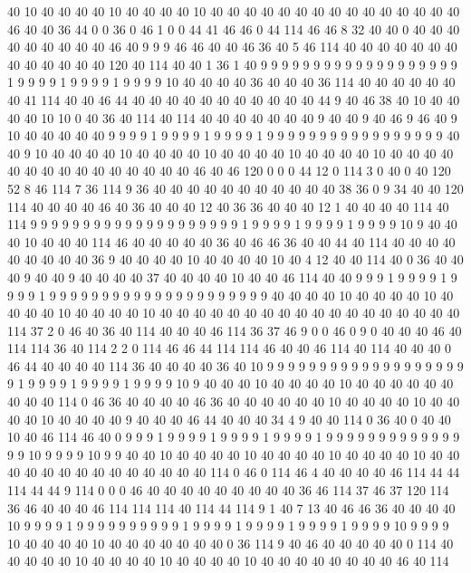 40 10 40 40 40 40 10 40 40 40 40 10 40 40 40 40 40 40 40 40
40 40 40 40 40 40 40 46 40 40 36 44 0 0 36 0 46 1 0 0
44 41 46 46 0 44 114 46 46 8 32 40 40 0 40 40 40 40 40 40
40 40 40 46 40 9 9 9 46 46 40 40 46 36 40 5 46 114 40 40
40 40 40 40 40 40 40 40 40 40 40 120 40 114 40 40 1 36 1 40
9 9 9 9 9 9 9 9 9 9 9 9 9 9 9 9 9 9 9 1
9 9 9 9 1 9 9 9 9 1 9 9 9 9 10 40 40 40 40 36
40 40 40 36 114 40 40 40 40 40 40 40 41 114 40 40 46 44 40 40
40 40 40 40 40 40 40 40 40 44 9 40 46 38 40 10 40 40 40 40
10 10 0 40 36 40 114 40 114 40 40 40 40 40 40 40 9 40 40 9
40 46 9 46 40 9 10 40 40 40 40 40 9 9 9 9 1 9 9 9
9 1 9 9 9 9 1 9 9 9 9 9 9 9 9 9 9 9 9 9
9 9 9 9 40 40 9 10 40 40 40 40 10 40 40 40 40 10 40 40
40 40 10 40 40 40 40 10 40 40 40 40 40 40 40 40 40 40 40 40
40 40 40 46 40 46 120 0 0 0 44 12 0 114 3 0 40 0 40 120
52 8 46 114 7 36 114 9 36 40 40 40 40 40 40 40 40 40 40 40
38 36 0 9 34 40 40 120 114 40 40 40 40 46 40 36 40 40 40 12
40 36 36 40 40 40 12 1 40 40 40 40 114 40 114 9 9 9 9 9
9 9 9 9 9 9 9 9 9 9 9 9 9 9 9 1 9 9 9 9
1 9 9 9 9 1 9 9 9 9 10 9 40 40 40 10 40 40 40 114
46 40 40 40 40 40 36 40 46 46 36 40 40 44 40 114 40 40 40 40
40 40 40 40 40 36 9 40 40 40 40 10 40 40 40 40 10 40 4 12
40 40 114 40 0 36 40 40 40 9 40 40 9 40 40 40 40 37 40 40
40 40 10 40 40 46 114 40 40 9 9 9 1 9 9 9 9 1 9 9
9 9 1 9 9 9 9 9 9 9 9 9 9 9 9 9 9 9 9 9
9 9 9 9 40 40 40 40 10 40 40 40 40 10 40 40 40 40 10 40
40 40 40 10 40 40 40 40 40 40 40 40 40 40 40 40 40 40 40 40
40 40 114 37 2 0 46 40 36 40 114 40 40 40 46 114 36 37 46 9
0 0 46 0 9 0 40 40 40 46 40 114 114 36 40 114 2 2 0 114
46 46 44 114 114 46 40 40 46 114 40 114 40 40 40 0 46 44 40 40
40 40 114 36 40 40 40 40 36 40 10 9 9 9 9 9 9 9 9 9
9 9 9 9 9 9 9 9 9 9 9 1 9 9 9 9 1 9 9 9
9 1 9 9 9 9 10 9 40 40 40 10 40 40 40 40 10 40 40 40
40 40 40 40 40 40 114 0 46 36 40 40 40 40 46 36 40 40 40 40
40 40 10 40 40 40 40 10 40 40 40 40 10 40 40 40 40 9 40 40
40 46 44 40 40 40 34 4 9 40 40 114 0 36 40 0 40 40 10 40
46 114 46 40 0 9 9 9 1 9 9 9 9 1 9 9 9 9 1 9
9 9 9 1 9 9 9 9 9 9 9 9 9 9 9 9 9 9 9 10
9 9 9 9 10 9 9 40 40 10 40 40 40 40 10 40 40 40 40 10
40 40 40 40 10 40 40 40 40 40 40 40 40 40 40 40 40 40 40 114
0 46 0 114 46 4 40 40 40 40 46 114 44 44 114 44 44 9 114 0
0 0 46 40 40 40 40 40 40 40 40 40 36 46 114 37 46 37 120 114
36 46 40 40 40 46 114 114 114 40 114 44 114 9 1 40 7 13 40 46
46 36 40 40 40 40 10 9 9 9 9 1 9 9 9 9 9 9 9 9
9 9 1 9 9 9 9 1 9 9 9 9 1 9 9 9 9 1 9 9
9 9 10 9 9 9 9 10 40 40 40 40 10 40 40 40 40 40 40 40
0 36 114 9 40 46 40 40 40 40 40 0 114 40 40 40 40 40 10 40
40 40 40 10 40 40 40 40 10 40 40 40 40 40 40 40 40 46 40 114
